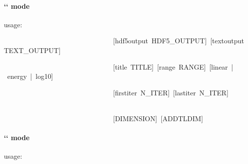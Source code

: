 \documentclass[letterpaper,10pt,english]{sphinxmanual}
\begin{document}
\paragraph{‘‘ mode}
\label{\detokenize{users_guide/command_line_tools/plothist:average-mode}}
usage:

\begin{DUlineblock}{0em}
\item[] 
\item[] \textasciigrave{}\textasciigrave{}                                {[}\textendash{}hdf5\sphinxhyphen{}output HDF5\_OUTPUT{]} {[}\textendash{}text\sphinxhyphen{}output TEXT\_OUTPUT{]}\textasciigrave{}\textasciigrave{}
\item[] \textasciigrave{}\textasciigrave{}                                {[}\textendash{}title TITLE{]} {[}\textendash{}range RANGE{]} {[}\textendash{}linear | \textendash{}energy | \textendash{}log10{]}\textasciigrave{}\textasciigrave{}
\item[] \textasciigrave{}\textasciigrave{}                                {[}\textendash{}first\sphinxhyphen{}iter N\_ITER{]} {[}\textendash{}last\sphinxhyphen{}iter N\_ITER{]}                           \textasciigrave{}\textasciigrave{}
\item[] \textasciigrave{}\textasciigrave{}                                {[}DIMENSION{]} {[}ADDTLDIM{]}\textasciigrave{}\textasciigrave{}
\end{DUlineblock}


\paragraph{‘‘ mode}
\label{\detokenize{users_guide/command_line_tools/plothist:evolution-mode}}
usage:
\end{document}
